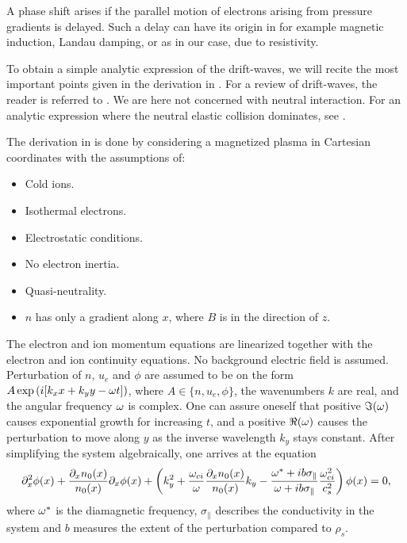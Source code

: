 A phase shift arises if the parallel motion of electrons arising from pressure gradients is delayed.
Such a delay can have its origin in for example magnetic induction, Landau damping, or as in our case, due to resistivity.

To obtain a simple analytic expression of the drift-waves, we will recite the most important points given in the derivation in \cite{Pecseli2016book}.
For a review of drift-waves, the reader is referred to \cite{Horton1999}.
We are here not concerned with neutral interaction.
For an analytic expression where the neutral elastic collision dominates, see \cite{Ellis1980}.

The derivation in \cite{Pecseli2016book} is done by considering a magnetized plasma in Cartesian coordinates with the assumptions of:
%
\begin{itemize}[noitemsep]
    \item Cold ions.
    \item Isothermal electrons.
    \item Electrostatic conditions.
    \item No electron inertia.
    \item Quasi-neutrality.
    \item $n$ has only a gradient along $x$, where $B$ is in the direction of $z$.
\end{itemize}
%
The electron and ion momentum equations are linearized together with the electron and ion continuity equations.
No background electric field is assumed.
Perturbation of $n$, $u_e$ and $\phi$ are assumed to be on the form $A\exp\left(i[k_x x + k_y y - \omega t]\right)$, where $A \in \{n, u_e, \phi\}$, the wavenumbers $k$ are real, and the angular frequency $\omega$ is complex.
One can assure oneself that positive $\Im(\omega)$ causes exponential growth for increasing $t$, and a positive $\Re(\omega)$ causes the perturbation to move along $y$ as the inverse wavelength $k_y$ stays constant.
After simplifying the system algebraically, one arrives at the equation
%
\begin{align}
    \partial_x^2 \phi(x) +
    \frac{\partial_x n_0(x)}{n_0(x)}\partial_x \phi(x)+
    \left(k_y^2 +
    \frac{\omega_{ci}}{\omega}\frac{\partial_x n_0(x)}{n_0(x)}k_y -
    \frac{\omega^*+ib\sigma_\|}{\omega+ib\sigma_\|}\frac{\omega_{ci}^2}{c_s^2}
    \right)\phi(x)
    =0,
    \label{eq:fullDisp}
\end{align}
%
where $\omega^*$ is the diamagnetic frequency, $\sigma_\|$ describes the conductivity in the system and $b$ measures the extent of the perturbation compared to $\rho_s$.
